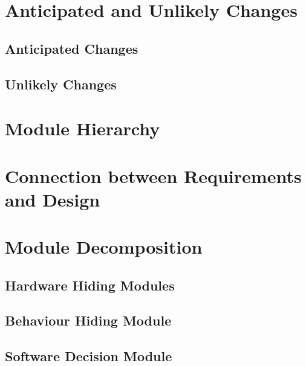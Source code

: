 \documentclass{article}
\begin{document}
\section{Anticipated and Unlikely Changes}
\subsection{Anticipated Changes}
\subsection{Unlikely Changes}

\section{Module Hierarchy}

\section{Connection between Requirements and Design}

\section{Module Decomposition}
\subsection{Hardware Hiding Modules}
\subsection{Behaviour Hiding Module}
\subsection{Software Decision Module}
\end{document}
